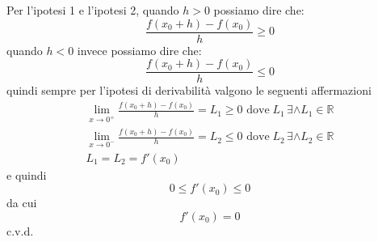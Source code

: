 \documentclass[../../dimostrazioni]{subfiles}
\begin{document}
                Per l'ipotesi 1 e l'ipotesi 2, quando \(h>0\) possiamo dire che:
                \[ \frac{f(x_0 + h) - f(x_0)}{h}  \geqslant 0\]
                quando \(h<0\) invece possiamo dire che:
                \[ \frac{f(x_0 + h) - f(x_0)}{h}  \leqslant 0\]
                quindi sempre per l'ipotesi di derivabilità valgono le seguenti affermazioni
                \begin{gather*}
                    \lim_{x\to 0^+} \frac{f(x_0 + h) - f(x_0)}{h} = L_1 \geqslant 0 \text{ dove} \; L_1 \, \exists \land L_1 \in \mathbb{R}\\
                    \lim_{x\to 0^-} \frac{f(x_0 + h) - f(x_0)}{h} = L_2  \leqslant 0 \text{ dove} \; L_2 \, \exists \land L_2 \in \mathbb{R}\\
                    L_1 = L_2 = f'(x_0)
                \end{gather*}
                e quindi
                \[0 \leqslant f'(x_0) \leqslant 0\]
                da cui
                \[f'(x_0)=0\]
                c.v.d.
\end{document}
